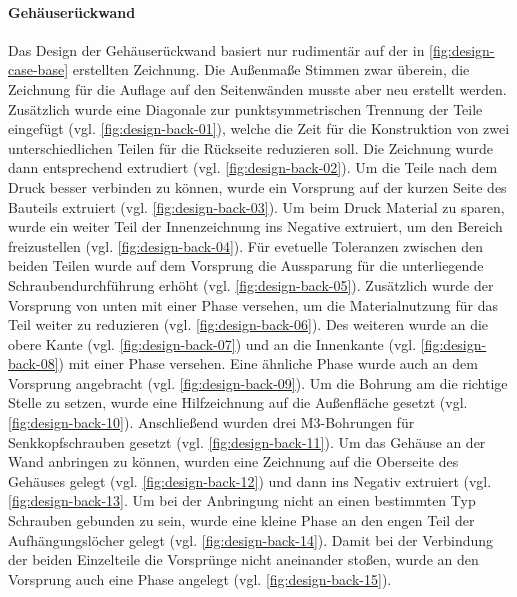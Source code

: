 \paragraph{Gehäuserückwand}
Das Design der Gehäuserückwand basiert nur rudimentär auf der in \ref{fig:design-case-base} erstellten Zeichnung. 
Die Außenmaße Stimmen zwar überein, die Zeichnung für die Auflage auf den Seitenwänden musste aber neu erstellt werden. Zusätzlich wurde eine Diagonale zur punktsymmetrischen Trennung der Teile eingefügt (vgl. \ref{fig:design-back-01}), welche die Zeit für die Konstruktion von zwei unterschiedlichen Teilen für die Rückseite reduzieren soll. 
Die Zeichnung wurde dann entsprechend extrudiert (vgl. \ref{fig:design-back-02}). Um die Teile nach dem Druck besser verbinden zu können, wurde ein Vorsprung auf der kurzen Seite des Bauteils extruiert (vgl. \ref{fig:design-back-03}). 
Um beim Druck Material zu sparen, wurde ein weiter Teil der Innenzeichnung ins Negative extruiert, um den Bereich freizustellen (vgl. \ref{fig:design-back-04}). 
Für evetuelle Toleranzen zwischen den beiden Teilen wurde auf dem Vorsprung die Aussparung für die unterliegende Schraubendurchführung erhöht (vgl. \ref{fig:design-back-05}). 
Zusätzlich wurde der Vorsprung von unten mit einer Phase versehen, um die Materialnutzung für das Teil weiter zu reduzieren (vgl. \ref{fig:design-back-06}). 
Des weiteren wurde an die obere Kante (vgl. \ref{fig:design-back-07}) und an die Innenkante (vgl. \ref{fig:design-back-08}) mit einer Phase versehen. Eine ähnliche Phase wurde auch an dem Vorsprung angebracht (vgl. \ref{fig:design-back-09}). 
Um die Bohrung am die richtige Stelle zu setzen, wurde eine Hilfzeichnung auf die Außenfläche gesetzt (vgl. \ref{fig:design-back-10}). Anschließend wurden drei M3-Bohrungen für Senkkopfschrauben gesetzt (vgl. \ref{fig:design-back-11}). 
Um das Gehäuse an der Wand anbringen zu können, wurden eine Zeichnung auf die Oberseite des Gehäuses gelegt (vgl. \ref{fig:design-back-12}) und dann ins Negativ extruiert (vgl. \ref{fig:design-back-13}. 
Um bei der Anbringung nicht an einen bestimmten Typ Schrauben gebunden zu sein, wurde eine kleine Phase an den engen Teil der Aufhängungslöcher gelegt (vgl. \ref{fig:design-back-14}). 
Damit bei der Verbindung der beiden Einzelteile die Vorsprünge nicht aneinander stoßen, wurde an den Vorsprung auch eine Phase angelegt (vgl. \ref{fig:design-back-15}).
